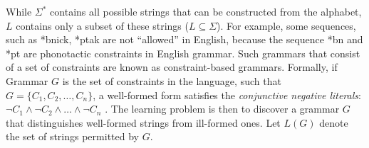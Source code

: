 While \(\Sigma^*\) contains all possible strings that can be 
constructed from the alphabet, \(L\) contains only a subset of these 
strings (\(L \subseteq \Sigma\)). For example, some sequences, such as *bnick, 
*ptak are not ``allowed'' in English, because the sequence *bn and *pt are
phonotactic constraints in English grammar. Such grammars that consist of 
a set of constraints are known as constraint-based grammars. Formally, if 
Grammar $G$ is the set of constraints in the language, such that \(G = \{C_1, C_2, \ldots, C_n\}\), a well-formed form satisfies the \emph{conjunctive 
negative literals}: \(\lnot C_1 \land \lnot C_2 \land \ldots \land \lnot C_n\)
\citep{jardine2017LocalNature,rogers.lambert2019mol}. The learning problem is 
then to discover a grammar \(G\) that distinguishes well-formed strings from 
ill-formed ones. Let \(L(G)\) denote the set of strings permitted by \(G\). 

